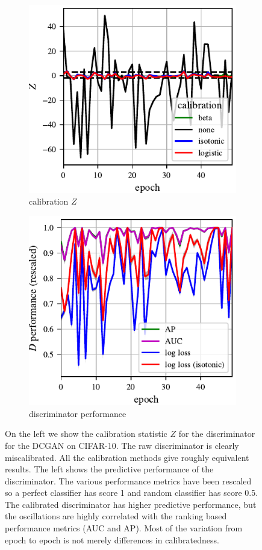 \documentclass{article}
\begin{document}
\begin{figure}
    \centering
    \begin{subfigure}[b]{0.49\textwidth}
       \centering
       \includegraphics[scale=0.9]{figures/disc_calib.pdf}
       \caption{calibration $Z$}
       \label{fig:calibration stat}
    \end{subfigure}
    \begin{subfigure}[b]{0.49\textwidth}
       \centering
       \includegraphics[scale=0.9]{figures/disc_perf.pdf}
       \caption{discriminator performance}
       \label{fig:discriminator_perf}
    \end{subfigure}
    \caption{{\small
    On the left we show the calibration statistic $Z$ for the discriminator for the DCGAN on CIFAR-10.
    The raw discriminator is clearly miscalibrated.
    All the calibration methods give roughly equivalent results.
    The left shows the predictive performance of the discriminator.
    The various performance metrics have been rescaled so a perfect classifier has score 1 and random classifier has score 0.5.
    The calibrated discriminator has higher predictive performance, but the oscillations are highly correlated with the ranking based performance metrics (AUC and AP)\@.
    Most of the variation from epoch to epoch is not merely differences in calibratedness.
    }}
    \label{fig:calibration}
\end{figure}
\end{document}
